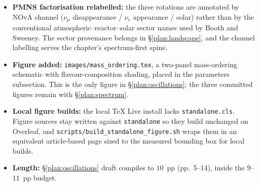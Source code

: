 \documentclass[11pt]{article}
\begin{document}
\begin{itemize}
    why $\nu_\mu$ disappearance is essentially unaffected before turning to appearance, inverting
    the usual MSW-diagonalisation ordering. The slab result is stated, not derived, as decided
    on 2026-06-30; the matter-modified $P(\nu_\mu\to\nu_e)$ expansion stays in \S\ref{plan:spectrum}.
    \item[$\checkmark$] \textbf{PMNS factorisation relabelled:} the three rotations are annotated
    by NOvA channel ($\nu_\mu$ disappearance / $\nu_e$ appearance / solar) rather than by the
    conventional atmospheric--reactor--solar sector names used by Booth and Sweeney. The sector
    provenance belongs in \S\ref{plan:landscape}, and the channel labelling serves the chapter's
    spectrum-first spine.
    \item[$\checkmark$] \textbf{Figure added:} \texttt{images/mass\_ordering.tex}, a two-panel
    mass-ordering schematic with flavour-composition shading, placed in the parameters
    subsection. This is the only figure in \S\ref{plan:oscillations}; the three committed
    figures remain with \S\ref{plan:spectrum}.
    \item[$\checkmark$] \textbf{Local figure builds:} the local TeX Live install lacks
    \texttt{standalone.cls}. Figure sources stay written against \texttt{standalone} so they
    build unchanged on Overleaf, and \texttt{scripts/build\_standalone\_figure.sh} wraps them in
    an equivalent article-based page sized to the measured bounding box for local builds.
    \item[$\checkmark$] \textbf{Length:} \S\ref{plan:oscillations} draft compiles to $10$~pp
    (pp.~5--14), inside the $9$--$11$~pp budget.
\end{itemize}
\end{document}
